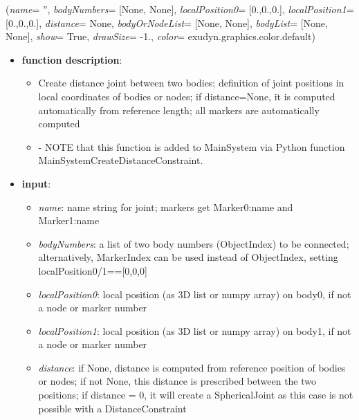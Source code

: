 %
\begin{flushleft}
\label{sec:mainsystemextensions:CreateDistanceConstraint}
({\it name}= '', {\it bodyNumbers}= [None, None], {\it localPosition0}= [0.,0.,0.], {\it localPosition1}= [0.,0.,0.], {\it distance}= None, {\it bodyOrNodeList}= [None, None], {\it bodyList}= [None, None], {\it show}= True, {\it drawSize}= -1., {\it color}= exudyn.graphics.color.default)
\end{flushleft}
\setlength{\itemindent}{0.7cm}
\begin{itemize}[leftmargin=0.7cm]
\item[--]
{\bf function description}: \vspace{-6pt}
\begin{itemize}[leftmargin=1.2cm]
\setlength{\itemindent}{-0.7cm}
\item[]Create distance joint between two bodies; definition of joint positions in local coordinates of bodies or nodes; if distance=None, it is computed automatically from reference length; all markers are automatically computed
\item[]- NOTE that this function is added to MainSystem via Python function MainSystemCreateDistanceConstraint.
\end{itemize}
\item[--]
{\bf input}: \vspace{-6pt}
\begin{itemize}[leftmargin=1.2cm]
\setlength{\itemindent}{-0.7cm}
\item[]{\it name}: name string for joint; markers get Marker0:name and Marker1:name
\item[]{\it bodyNumbers}: a list of two body numbers (ObjectIndex) to be connected; alternatively, MarkerIndex can be used instead of ObjectIndex, setting localPosition0/1==[0,0,0]
\item[]{\it localPosition0}: local position (as 3D list or numpy array) on body0, if not a node or marker number
\item[]{\it localPosition1}: local position (as 3D list or numpy array) on body1, if not a node or marker number
\item[]{\it distance}: if None, distance is computed from reference position of bodies or nodes; if not None, this distance is prescribed between the two positions; if distance = 0, it will create a SphericalJoint as this case is not possible with a DistanceConstraint

\end{itemize}
\end{itemize}

